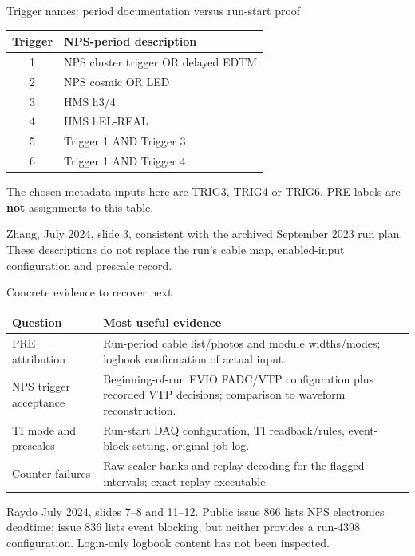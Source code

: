 \documentclass[aspectratio=169,11pt]{beamer}
\newcommand{\source}[1]{\par\vfill{\scriptsize\color{muted}#1\par}}
\begin{document}
\begin{frame}{Trigger names: period documentation versus run-start proof}
\small\renewcommand{\arraystretch}{1.4}
\begin{tabular}{@{}cl@{}}\toprule
Trigger & NPS-period description\\\midrule
1 & NPS cluster trigger OR delayed EDTM\\
2 & NPS cosmic OR LED\\
3 & HMS h3/4\\
4 & HMS hEL-REAL\\
5 & Trigger 1 AND Trigger 3\\
6 & Trigger 1 AND Trigger 4\\\bottomrule
\end{tabular}
\vspace{3mm}\par\small The chosen metadata inputs here are TRIG3, TRIG4 or TRIG6. PRE labels are \textbf{not} assignments to this table.
\source{Zhang, July 2024, slide 3, consistent with the archived September 2023 run plan. These descriptions do not replace the run's cable map, enabled-input configuration and prescale record.}
\end{frame}

\begin{frame}{Concrete evidence to recover next}
\small\renewcommand{\arraystretch}{1.35}
\begin{tabular}{@{}p{}p{}@{}}\toprule
Question & Most useful evidence\\\midrule
PRE attribution & Run-period cable list/photos and module widths/modes; logbook confirmation of actual input.\\
NPS trigger acceptance & Beginning-of-run EVIO FADC/VTP configuration plus recorded VTP decisions; comparison to waveform reconstruction.\\
TI mode and prescales & Run-start DAQ configuration, TI readback/rules, event-block setting, original job log.\\
Counter failures & Raw scaler banks and replay decoding for the flagged intervals; exact replay executable.\\\bottomrule
\end{tabular}
\source{Raydo July 2024, slides 7--8 and 11--12. Public issue 866 lists NPS electronics deadtime; issue 836 lists event blocking, but neither provides a run-4398 configuration. Login-only logbook content has not been inspected.}
\end{frame}
\end{document}
